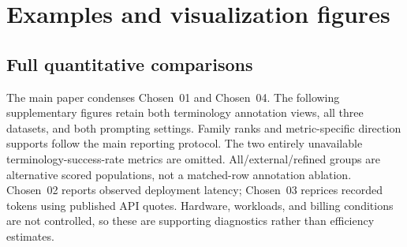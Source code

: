 \section{Examples and visualization figures}

\subsection{Full quantitative comparisons}
The main paper condenses Chosen~01 and Chosen~04. The following supplementary figures retain both
terminology annotation views, all three datasets, and both prompting settings. Family ranks and
metric-specific direction supports follow the main reporting protocol. The two entirely unavailable
terminology-success-rate metrics are omitted. All/external/refined groups are alternative scored
populations, not a matched-row annotation ablation. Chosen~02 reports observed deployment latency;
Chosen~03 reprices recorded tokens using published API quotes. Hardware, workloads, and billing
conditions are not controlled, so these are supporting diagnostics rather than efficiency estimates.

